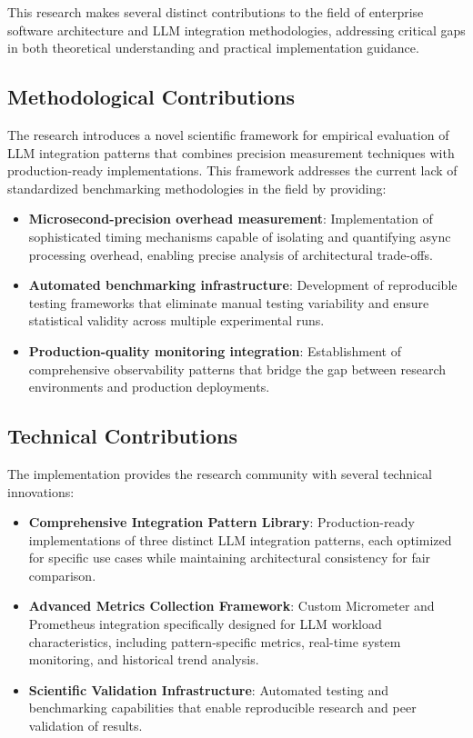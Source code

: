 This research makes several distinct contributions to the field of enterprise software architecture and LLM integration methodologies, addressing critical gaps in both theoretical understanding and practical implementation guidance.

\subsection{Methodological Contributions}

The research introduces a novel scientific framework for empirical evaluation of LLM integration patterns that combines precision measurement techniques with production-ready implementations. This framework addresses the current lack of standardized benchmarking methodologies in the field by providing:

\begin{itemize}
    \item \textbf{Microsecond-precision overhead measurement}: Implementation of sophisticated timing mechanisms capable of isolating and quantifying async processing overhead, enabling precise analysis of architectural trade-offs.
    \item \textbf{Automated benchmarking infrastructure}: Development of reproducible testing frameworks that eliminate manual testing variability and ensure statistical validity across multiple experimental runs.
    \item \textbf{Production-quality monitoring integration}: Establishment of comprehensive observability patterns that bridge the gap between research environments and production deployments.
\end{itemize}

\subsection{Technical Contributions}

The implementation provides the research community with several technical innovations:

\begin{itemize}
    \item \textbf{Comprehensive Integration Pattern Library}: Production-ready implementations of three distinct LLM integration patterns, each optimized for specific use cases while maintaining architectural consistency for fair comparison.
    \item \textbf{Advanced Metrics Collection Framework}: Custom Micrometer and Prometheus integration specifically designed for LLM workload characteristics, including pattern-specific metrics, real-time system monitoring, and historical trend analysis.
    \item \textbf{Scientific Validation Infrastructure}: Automated testing and benchmarking capabilities that enable reproducible research and peer validation of results.
\end{itemize}

